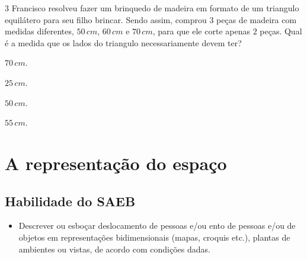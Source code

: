 \num{3}  Francisco resolveu fazer um brinquedo de madeira em formato de um
triangulo equilátero para seu filho brincar. Sendo assim, comprou $3$ peças
de madeira com medidas diferentes, $50\,cm$, $60\,cm$ e $70\,cm$, para que ele
corte apenas $2$ peças. Qual é a medida que os lados do triangulo
necessariamente devem ter?

\begin{escolha}
\item $70\,cm$.
\item $25\,cm$.
\item $50\,cm$.
\item $55\,cm$.
\end{escolha}



\chapter{A representação do espaço}

\section*{Habilidade do SAEB} 
\begin{itemize}
\item Descrever ou esboçar deslocamento de pessoas e/ou
ento de pessoas e/ou de objetos em representações bidimensionais (mapas, croquis etc.),
plantas de ambientes ou vistas, de acordo com condições dadas.
\end{itemize}


